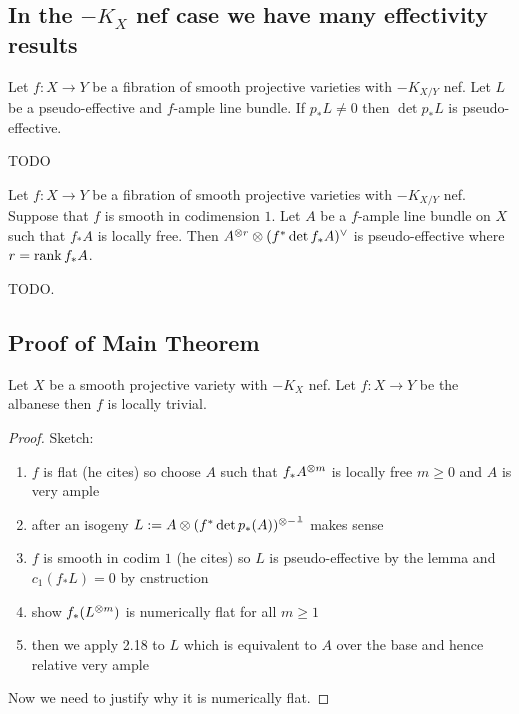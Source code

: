 \documentclass[12pt]{article}
\begin{document}
\subsection{In the $-K_X$ nef case we have many effectivity results}

\begin{prop}[Cao, 3.16]
Let $f : X \to Y$ be a fibration of smooth projective varieties with $-K_{X/Y}$ nef. Let $L$ be a pseudo-effective and $f$-ample line bundle. If $p_* L \neq 0$ then $\det{p_* L}$ is pseudo-effective.
\end{prop}

TODO

\begin{prop}[Cao, 3.15]
Let $f : X \to Y$ be a fibration of smooth projective varieties with $-K_{X/Y}$ nef. Suppose that $f$ is smooth in codimension $1$. Let $A$ be a $f$-ample line bundle on $X$ such that $f_* A$ is locally free. Then $A^{\otimes r} \otimes (f^* \det{f_* A})^\vee$ is pseudo-effective where $r = \operatorname{\mathrm{rank}}{f_* A}$.
\end{prop}


TODO.

\subsection{Proof of Main Theorem}

\begin{theorem}[Cao 4.17]
Let $X$ be a smooth projective variety with $-K_X$ nef. Let $f : X \to Y$ be the albanese then $f$ is locally trivial.
\end{theorem}

\begin{proof}
Sketch:
\begin{enumerate}
\item $f$ is flat (he cites) so choose $A$ such that $f_* A^{\otimes m}$ is locally free $m \ge 0$ and $A$ is very ample
\item after an isogeny $L := A \otimes (f^* \det{p_*(A)})^{\otimes - \frac{1}{}}$ makes sense
\item $f$ is smooth in codim $1$ (he cites) so $L$ is pseudo-effective by the lemma and $c_1(f_* L) = 0$ by cnstruction
\item show $f_*(L^{\otimes m})$ is numerically flat for all $m \ge 1$
\item then we apply 2.18 to $L$ which is equivalent to $A$ over the base and hence relative very ample
\end{enumerate}
Now we need to justify why it is numerically flat. 
\end{proof}
\end{document}
